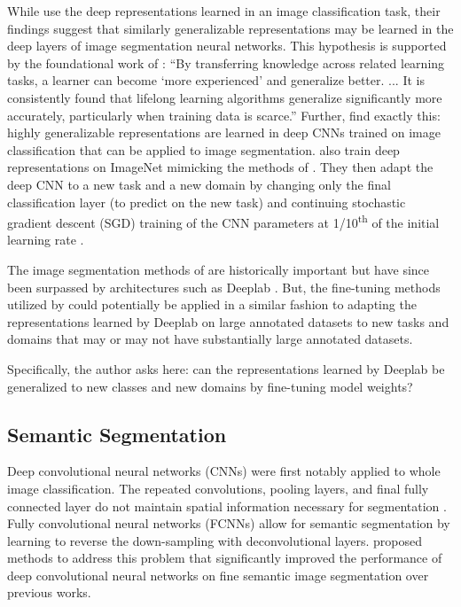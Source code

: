\documentclass[10pt,twocolumn,letterpaper]{article}
\begin{document}
 While \citet{donahue2014decaf} use the deep representations learned in an image classification task, their findings suggest that similarly generalizable representations
 may be learned in the deep layers of image segmentation neural networks. This hypothesis is supported by the foundational work of \citet{thrun1996learning}:
  \enquote{By transferring knowledge across related learning tasks, a learner can become \enquote{more experienced} and generalize better.
  ... It is consistently found that lifelong learning algorithms generalize significantly more accurately, particularly when training data is scarce.}
  Further, \citet{girshick2014rich} find exactly this: highly generalizable representations are learned in deep CNNs trained on image classification that can be applied to
  image segmentation. \citet{girshick2014rich} also train deep representations on ImageNet \cite{deng2009imagenet} mimicking the methods of \citet{krizhevsky2012imagenet}.
  They then adapt the deep CNN to a new task and a new domain by changing only the final classification layer (to predict on the new task) and
  continuing stochastic gradient descent (SGD) training of the CNN parameters at 1/10\textsuperscript{th} of the initial learning rate \cite{girshick2014rich}.

  The image segmentation methods of \citet{girshick2014rich} are historically important but have since been surpassed by architectures such as Deeplab \cite{chen2018deeplab}.
  But, the fine-tuning methods utilized by \citet{girshick2014rich} could potentially be applied in a similar fashion to adapting the representations learned by Deeplab
  on large annotated datasets to new tasks and domains that may or may not have substantially large annotated datasets.

  Specifically, the author asks here: can the representations learned by Deeplab be generalized to new classes and new domains by fine-tuning model weights?


\subsection{Semantic Segmentation}
Deep convolutional neural networks (CNNs) were first notably applied to whole image classification. The repeated convolutions, pooling layers,
and final fully connected layer do not maintain spatial information necessary for segmentation \cite{marmanis2016semantic}.
Fully convolutional neural networks (FCNNs) allow for semantic segmentation by learning to reverse the down-sampling with deconvolutional layers.
\citet{chen2018deeplab} proposed methods to address this problem that significantly improved the performance of
deep convolutional neural networks on fine semantic image segmentation over previous works.
\end{document}
